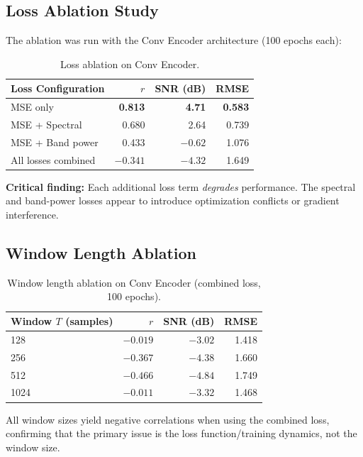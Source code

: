 \documentclass[11pt,a4paper]{article}
\begin{document}
\subsection{Loss Ablation Study}

The ablation was run with the Conv Encoder architecture (100 epochs each):

\begin{table}[H]
\centering
\caption{Loss ablation on Conv Encoder.}
\label{tab:ablation_loss}
\begin{tabular}{lrrr}
\toprule
Loss Configuration & $r$ & SNR (dB) & RMSE \\
\midrule
MSE only            & \textbf{0.813} & \textbf{4.71}  & \textbf{0.583} \\
MSE + Spectral      & 0.680          & 2.64           & 0.739 \\
MSE + Band power    & 0.433          & $-0.62$        & 1.076 \\
All losses combined & $-0.341$       & $-4.32$        & 1.649 \\
\bottomrule
\end{tabular}
\end{table}

\textbf{Critical finding:} Each additional loss term \emph{degrades} performance.
The spectral and band-power losses appear to introduce optimization conflicts
or gradient interference.

\subsection{Window Length Ablation}

\begin{table}[H]
\centering
\caption{Window length ablation on Conv Encoder (combined loss, 100 epochs).}
\label{tab:ablation_window}
\begin{tabular}{lrrr}
\toprule
Window $T$ (samples) & $r$ & SNR (dB) & RMSE \\
\midrule
128  & $-0.019$ & $-3.02$ & 1.418 \\
256  & $-0.367$ & $-4.38$ & 1.660 \\
512  & $-0.466$ & $-4.84$ & 1.749 \\
1024 & $-0.011$ & $-3.32$ & 1.468 \\
\bottomrule
\end{tabular}
\end{table}

All window sizes yield negative correlations when using the combined loss,
confirming that the primary issue is the loss function/training dynamics, not
the window size.
\end{document}
